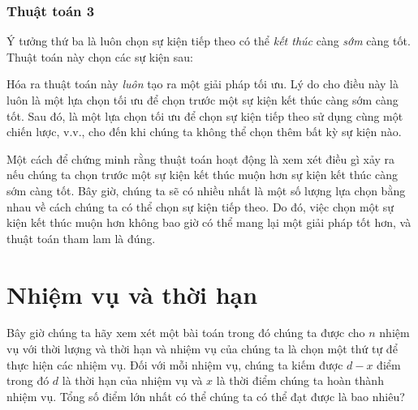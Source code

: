 \subsubsection*{Thuật toán 3}

Ý tưởng thứ ba là luôn chọn sự kiện
tiếp theo có thể \emph{kết thúc} càng \emph{sớm} càng tốt.
Thuật toán này chọn các sự kiện sau:
\begin{center}
\end{center}

Hóa ra thuật toán này
\emph{luôn} tạo ra một giải pháp tối ưu.
Lý do cho điều này là luôn là một lựa chọn tối ưu
để chọn trước một sự kiện kết thúc
càng sớm càng tốt.
Sau đó, là một lựa chọn tối ưu
để chọn sự kiện tiếp theo
sử dụng cùng một chiến lược, v.v.,
cho đến khi chúng ta không thể chọn thêm bất kỳ sự kiện nào.

Một cách để chứng minh rằng thuật toán hoạt động
là xem xét
điều gì xảy ra nếu chúng ta chọn trước một sự kiện
kết thúc muộn hơn sự kiện kết thúc
càng sớm càng tốt.
Bây giờ, chúng ta sẽ có nhiều nhất là một số lượng
lựa chọn bằng nhau về cách chúng ta có thể chọn sự kiện tiếp theo.
Do đó, việc chọn một sự kiện kết thúc muộn hơn
không bao giờ có thể mang lại một giải pháp tốt hơn,
và thuật toán tham lam là đúng.

\section{Nhiệm vụ và thời hạn}

Bây giờ chúng ta hãy xem xét một bài toán trong đó
chúng ta được cho $n$ nhiệm vụ với thời lượng và thời hạn
và nhiệm vụ của chúng ta là chọn một thứ tự để thực hiện các nhiệm vụ.
Đối với mỗi nhiệm vụ, chúng ta kiếm được $d-x$ điểm
trong đó $d$ là thời hạn của nhiệm vụ
và $x$ là thời điểm chúng ta hoàn thành nhiệm vụ.
Tổng số điểm lớn nhất có thể
chúng ta có thể đạt được là bao nhiêu?

